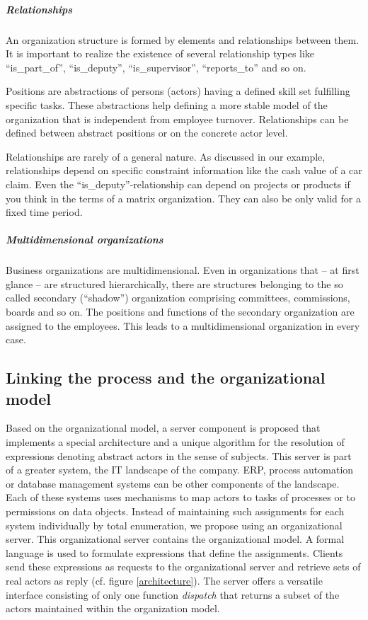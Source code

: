 \subparagraph{Relationships}
An organization structure is formed by elements and relationships between them. It is important to realize the existence of several relationship types like ``is\_part\_of'', ``is\_deputy'', ``is\_supervisor'', ``reports\_to'' and so on.

Positions are abstractions of persons (actors) having a defined skill set fulfilling specific tasks. These abstractions help defining a more stable model of the organization that is independent from employee turnover. Relationships can be defined between abstract positions or on the concrete actor level.

Relationships are rarely of a general nature. As discussed in our example, relationships depend on specific constraint information like the cash value of a car claim. Even the ``is\_deputy''-relationship can depend on projects or products if you think in the terms of a matrix organization. They can also be only valid for a fixed time period.

\subparagraph{Multidimensional organizations}
Business organizations are multidimensional. Even in organizations that -- at first glance -- are structured hierarchically, there are structures belonging to the so called secondary (``shadow'') organization comprising committees, commissions, boards and so on. The positions and functions of the secondary organization are assigned to the employees. This leads to a multidimensional organization in every case. %

\subsection{Linking the process and the organizational model} \label{chapter_Linking}

Based on the organizational model, a server component is proposed that implements a special architecture and a unique algorithm for the resolution of expressions denoting abstract actors in the sense of subjects. This server is part of a greater system, the IT landscape of the company. ERP, process automation or database management systems can be other components of the landscape. Each of these systems uses mechanisms to map actors to tasks of processes or to permissions on data objects. Instead of maintaining such assignments for each system individually by total enumeration, we propose using an organizational server. This organizational server contains the organizational model. A formal language is used to formulate expressions that define the assignments. Clients send these expressions as requests to the organizational server and retrieve sets of real actors as reply (cf. figure \ref{architecture}). The server offers a versatile interface consisting of only one function \emph{dispatch} that returns a subset of the actors maintained within the organization model.

